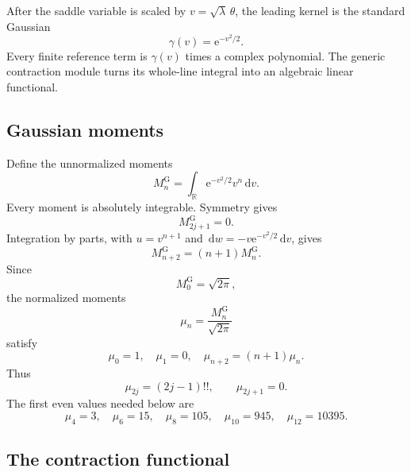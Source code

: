 \documentclass[11pt,oneside]{article}
\theoremstyle{definition}
\theoremstyle{remark}
\newcommand{\R}{\mathbb R}
\newcommand{\e}{\mathrm e}
\newcommand{\dd}{\,\mathrm d}
\begin{document}
After the saddle variable is scaled by $v=\sqrt{\lambda}\,\theta$, the leading kernel is the
standard Gaussian
\begin{equation}
 \gamma(v)=\e^{-v^2/2}.
 \label{eq:standard-gaussian-kernel}
\end{equation}
Every finite reference term is $\gamma(v)$ times a complex polynomial.  The generic
contraction module turns its whole-line integral into an algebraic linear functional.

\subsection{Gaussian moments}

Define the unnormalized moments
\begin{equation}
 M_n^{\mathrm G}=\int_{\R}\e^{-v^2/2}v^n\dd v.
 \label{eq:real-gaussian-moment}
\end{equation}
Every moment is absolutely integrable.  Symmetry gives
\begin{equation}
 M_{2j+1}^{\mathrm G}=0.
 \label{eq:gaussian-odd-zero}
\end{equation}
Integration by parts, with $u=v^{n+1}$ and
$\dd w=-v\e^{-v^2/2}\dd v$, gives
\begin{equation}
 M_{n+2}^{\mathrm G}=(n+1)M_n^{\mathrm G}.
 \label{eq:gaussian-moment-recurrence}
\end{equation}
Since
\begin{equation}
 M_0^{\mathrm G}=\sqrt{2\pi},
 \label{eq:gaussian-moment-zero}
\end{equation}
the normalized moments
\begin{equation}
 \mu_n=\frac{M_n^{\mathrm G}}{\sqrt{2\pi}}
 \label{eq:normalized-gaussian-moment}
\end{equation}
satisfy
\begin{equation}
 \mu_0=1,
 \quad
 \mu_1=0,
 \quad
 \mu_{n+2}=(n+1)\mu_n.
 \label{eq:normalized-gaussian-recurrence}
\end{equation}
Thus
\begin{equation}
 \mu_{2j}=(2j-1)!!,
 \qquad
 \mu_{2j+1}=0.
 \label{eq:normalized-gaussian-closed}
\end{equation}
The first even values needed below are
\begin{equation}
 \mu_4=3,
 \quad
 \mu_6=15,
 \quad
 \mu_8=105,
 \quad
 \mu_{10}=945,
 \quad
 \mu_{12}=10395.
 \label{eq:gaussian-moments-second-correction}
\end{equation}

\subsection{The contraction functional}
\end{document}
